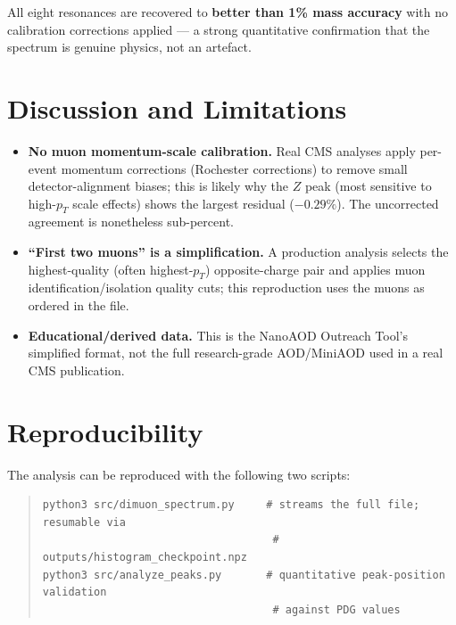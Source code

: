 \documentclass[11pt,a4paper]{article}
\begin{document}
All eight resonances are recovered to \textbf{better than 1\% mass accuracy} with no calibration
corrections applied --- a strong quantitative confirmation that the spectrum is genuine physics,
not an artefact.

\section{Discussion and Limitations}

\begin{itemize}
\item \textbf{No muon momentum-scale calibration.} Real CMS analyses apply per-event momentum
  corrections (Rochester corrections) to remove small detector-alignment biases; this is likely
  why the $Z$ peak (most sensitive to high-$p_T$ scale effects) shows the largest residual
  ($-0.29\%$). The uncorrected agreement is nonetheless sub-percent.
\item \textbf{``First two muons'' is a simplification.} A production analysis selects the
  highest-quality (often highest-$p_T$) opposite-charge pair and applies muon
  identification/isolation quality cuts; this reproduction uses the muons as ordered in the file.
\item \textbf{Educational/derived data.} This is the NanoAOD Outreach Tool's simplified format,
  not the full research-grade AOD/MiniAOD used in a real CMS publication.
\end{itemize}

\section{Reproducibility}

The analysis can be reproduced with the following two scripts:

\begin{quote}
\begin{verbatim}
python3 src/dimuon_spectrum.py     # streams the full file; resumable via
                                    # outputs/histogram_checkpoint.npz
python3 src/analyze_peaks.py       # quantitative peak-position validation
                                    # against PDG values
\end{verbatim}
\end{quote}
\end{document}
